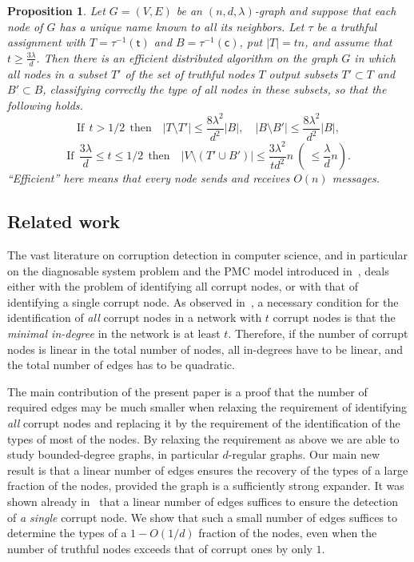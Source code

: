\documentclass[11pt]{article}
\numberwithin{equation}{section}
\newtheorem{proposition}[theorem]{Proposition}
\theoremstyle{definition}
\theoremstyle{plain}
\begin{document}
%
\begin{proposition} 
\label{p:distributed}
Let $G=(V,E)$ be an $(n,d, \lambda)$-graph and suppose that each node
of $G$ has a unique name known to all its neighbors.
Let $\tau$ be a truthful assignment with 
$T = \tau^{-1}(\mathsf{t})$ and $B =  \tau^{-1}(\mathsf{c})$,
put $|T|=tn$, and assume that
$t \geq \frac{3 \lambda}{d}$. Then there is 
an efficient  distributed algorithm on the graph $G$  in which
%
all nodes in a subset $T'$ of the set of truthful nodes $T$ output
subsets $T' \subset T$ and $B' \subset B$, classifying correctly the
type of all nodes in these subsets,  so that the following
holds.  
%
%
\begin{equation} 
\label{eq101}
\mbox{If}~~t >1/2~~ \mbox{then} \quad 
|T \setminus T'| \leq \frac{8\lambda^2}{d^2} |B| , \quad 
|B \setminus B'| \leq  \frac{8 \lambda^2}{d^2} |B|,
\end{equation}
\begin{equation} 
\label{eq102}
\mbox{If}~~\frac{3 \lambda}{d} \leq t \leq 1/2~~ \mbox{then} \quad 
|V \setminus (T' \cup B')| \leq \frac{3\lambda^2}{td^2}n
 ~(~\leq  \frac{\lambda}{d} n).
\end{equation}
%
%
%
%
%
%
%
%
%
%
``Efficient'' here means that every node sends and receives $O(n)$
messages. %
\end{proposition} 

\subsection{Related work} 

The vast literature on corruption detection in computer science,
and in particular on the diagnosable system problem and the PMC model
introduced in~\cite{PMC67},
%
deals  %
either with the problem of identifying all
corrupt nodes, or with that of identifying a single corrupt node. 
As observed in~\cite{PMC67},  a necessary condition 
for the identification of \emph{all} corrupt nodes in a network with $t$ 
corrupt nodes is that the \emph{minimal in-degree} 
in the network is at least $t$.
Therefore, if the number of corrupt nodes is linear in the total number
of nodes, all in-degrees have to be linear, and the total
number of edges has to be quadratic.

The main contribution of the present paper is 
a proof that the number of required edges may be much smaller
when relaxing the requirement of 
identifying \emph{all} corrupt nodes and replacing it by the 
requirement of the 
identification of the types
%
%
of most of the nodes.  %
By relaxing the requirement as above 
we are able to study bounded-degree graphs, in particular $d$-regular graphs. 
Our main new result is that a linear number
%
of edges ensures the recovery of the types of a large fraction
of the nodes, provided the graph is a sufficiently strong expander.
It was shown already
in~\cite{PMC67} that   a linear number of edges suffices
to ensure the detection
of \emph{a single} corrupt node. We show that such a small number of
edges suffices to determine the types of a $1-O(1/d)$ fraction of the 
nodes, even when the number of truthful nodes exceeds that of
corrupt ones by only $1$.
\end{document}
